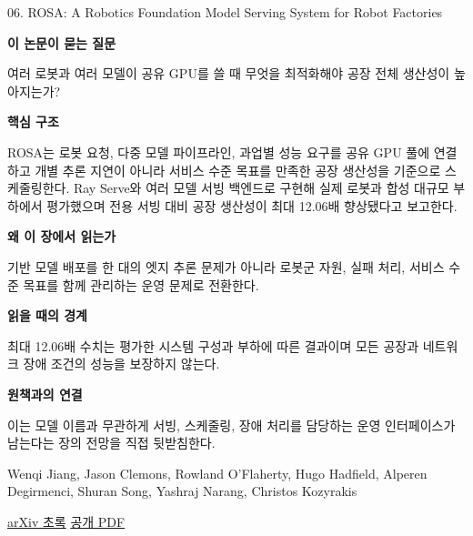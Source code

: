 \documentclass[11pt,openany]{book}
\begin{document}
\begin{termcard}{06. ROSA: A Robotics Foundation Model Serving System for Robot Factories}

\par

\medskip

{\sffamily\bfseries\color{deepblue} 이 논문이 묻는 질문}\par

여러 로봇과 여러 모델이 공유 GPU를 쓸 때 무엇을 최적화해야 공장 전체 생산성이 높아지는가?

\smallskip

{\sffamily\bfseries\color{deepblue} 핵심 구조}\par

ROSA는 로봇 요청, 다중 모델 파이프라인, 과업별 성능 요구를 공유 GPU 풀에 연결하고 개별 추론 지연이 아니라 서비스 수준 목표를 만족한 공장 생산성을 기준으로 스케줄링한다. Ray Serve와 여러 모델 서빙 백엔드로 구현해 실제 로봇과 합성 대규모 부하에서 평가했으며 전용 서빙 대비 공장 생산성이 최대 12.06배 향상됐다고 보고한다.

\smallskip

{\sffamily\bfseries\color{deepblue} 왜 이 장에서 읽는가}\par

기반 모델 배포를 한 대의 엣지 추론 문제가 아니라 로봇군 자원, 실패 처리, 서비스 수준 목표를 함께 관리하는 운영 문제로 전환한다.

\smallskip

{\sffamily\bfseries\color{coral} 읽을 때의 경계}\par

최대 12.06배 수치는 평가한 시스템 구성과 부하에 따른 결과이며 모든 공장과 네트워크 장애 조건의 성능을 보장하지 않는다.

\smallskip

{\sffamily\bfseries\color{teal} 원책과의 연결}\par

이는 모델 이름과 무관하게 서빙, 스케줄링, 장애 처리를 담당하는 운영 인터페이스가 남는다는 장의 전망을 직접 뒷받침한다.

\medskip

{\footnotesize\color{muted} Wenqi Jiang, Jason Clemons, Rowland O'Flaherty, Hugo Hadfield, Alperen Degirmenci, Shuran Song, Yashraj Narang, Christos Kozyrakis\par

\href{https://arxiv.org/abs/2607.01088}{arXiv 초록} \quad \href{https://arxiv.org/pdf/2607.01088}{공개 PDF}\par}

\end{termcard}
\end{document}
